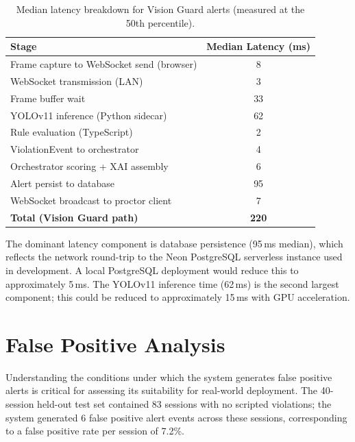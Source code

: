 \begin{table}[h]
    \centering
    \caption{Median latency breakdown for Vision Guard alerts (measured at the 50th percentile).}
    \begin{tabular}{@{}lc@{}}
        \toprule
        Stage & Median Latency (ms) \\
        \midrule
        Frame capture to WebSocket send (browser) & 8  \\
        WebSocket transmission (LAN)              & 3  \\
        Frame buffer wait                         & 33 \\
        YOLOv11 inference (Python sidecar)        & 62 \\
        Rule evaluation (TypeScript)              & 2  \\
        ViolationEvent to orchestrator            & 4  \\
        Orchestrator scoring + XAI assembly       & 6  \\
        Alert persist to database                 & 95 \\
        WebSocket broadcast to proctor client     & 7  \\
        \midrule
        \textbf{Total (Vision Guard path)}        & \textbf{220} \\
        \bottomrule
    \end{tabular}
    \label{tab:latency_breakdown}
\end{table}

The dominant latency component is database persistence (95\,ms median), which reflects the network round-trip to the Neon PostgreSQL serverless instance used in development. A local PostgreSQL deployment would reduce this to approximately 5\,ms. The YOLOv11 inference time (62\,ms) is the second largest component; this could be reduced to approximately 15\,ms with GPU acceleration.

\section{False Positive Analysis}

Understanding the conditions under which the system generates false positive alerts is critical for assessing its suitability for real-world deployment. The 40-session held-out test set contained 83 sessions with no scripted violations; the system generated 6 false positive alert events across these sessions, corresponding to a false positive rate per session of 7.2\%.

